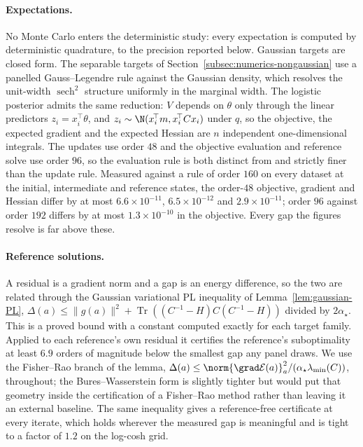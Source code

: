 \paragraph{Expectations.}
No Monte Carlo enters the deterministic study: every expectation is computed by
deterministic quadrature, to the precision reported below. Gaussian targets are
closed form. The separable targets of
Section~\ref{subsec:numerics-nongaussian} use a panelled Gauss--Legendre rule
against the Gaussian density, which resolves the unit-width
$\operatorname{sech}^2$ structure uniformly in the marginal width. The logistic
posterior admits the same reduction: $V$ depends on $\theta$ only through the
linear predictors $z_i=x_i^{\!\top}\theta$, and $z_i\sim\N(x_i^{\!\top}m,
x_i^{\!\top}Cx_i)$ under $q$, so the objective, the expected gradient and the
expected Hessian are $n$ independent one-dimensional integrals. The updates use
order $48$ and the objective evaluation and reference solve use order $96$, so the
evaluation rule is both distinct from and strictly finer than the update rule.
Measured against a rule of order $160$ on every dataset at the initial,
intermediate and reference states, the order-$48$ objective, gradient and Hessian
differ by at most $6.6\times10^{-11}$, $6.5\times10^{-12}$ and
$2.9\times10^{-11}$; order $96$ against order $192$ differs by at most
$1.3\times10^{-10}$ in the objective. Every gap the figures resolve is far above
these.

\paragraph{Reference solutions.}
A residual is a gradient norm and a gap is an energy difference, so the two are
related through the Gaussian variational PL inequality of
Lemma~\ref{lem:gaussian-PL}, $\Delta(a)\le\|g(a)\|^2+\operatorname{Tr}((C^{-1}-H)C(C^{-1}-H))$
divided by $2\alpha_\star$. This is a proved bound with a constant computed
exactly for each target family. Applied to each reference's own residual it
certifies the reference's suboptimality at least $6.9$ orders of magnitude below
the smallest gap any panel draws. We use the Fisher--Rao branch of the lemma,
$\Delta(a)\le\norm{\grad\mathcal E(a)}_a^2/(\alpha_\star\lambda_{\min}(C))$,
throughout; the Bures--Wasserstein form is slightly tighter but would put that
geometry inside the certification of a Fisher--Rao method rather than leaving it
an external baseline. The same inequality gives a reference-free certificate at
every iterate, which holds wherever the measured gap is meaningful and is tight to
a factor of $1.2$ on the log-cosh grid.

